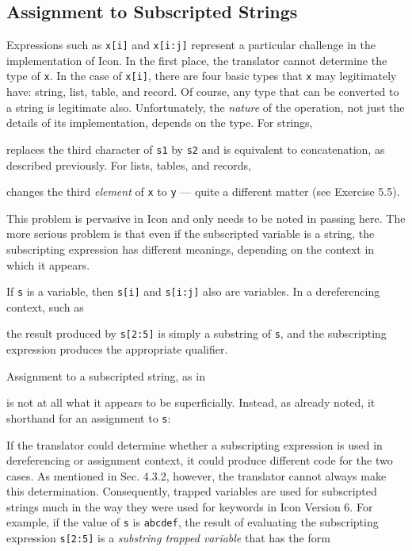 \subsection{Assignment to Subscripted Strings}

Expressions such as \texttt{x[i]} and \texttt{x[i:j]} represent a
particular challenge in the implementation of Icon. In the first
place, the translator cannot determine the type of \texttt{x}. In the case of
\texttt{x[i]}, there are four basic types that \texttt{x} may
legitimately have: string, list, table, and record. Of course, any
type that can be converted to a string is legitimate
also. Unfortunately, the \textit{nature }of the operation, not just
the details of its implementation, depends on the type. For strings,


\noindent replaces the third character of \texttt{s1} by \texttt{s2}
and is equivalent to concatenation, as described previously.  For
lists, tables, and records,


\noindent changes the third \textit{element }of \texttt{x} to
\texttt{y} --- quite a different matter (see Exercise 5.5).

This problem is pervasive in Icon and only needs to be noted in
passing here. The more serious problem is that even if the subscripted
variable is a string, the subscripting expression has different
meanings, depending on the context in which it appears.

If \texttt{s} is a variable, then \texttt{s[i]} and \texttt{s[i:j]}
also are variables. In a dereferencing context, such as


\noindent the result produced by \texttt{s[2:5]} is simply a substring
of \texttt{s}, and the subscripting expression produces the
appropriate qualifier.

Assignment to a subscripted string, as in


\noindent is not at all what it appears to be superficially. Instead,
as already noted, it shorthand for an assignment to \texttt{s}:


If the translator could determine whether a subscripting expression is
used in dereferencing or assignment context, it could produce
different code for the two cases. As mentioned in Sec. 4.3.2, however,
the translator cannot always make this determination. Consequently,
trapped variables are used for subscripted strings much in the way they
were used for keywords in Icon Version 6. For example, if the value of \texttt{s} is
\texttt{{\textquotedbl}abcdef{\textquotedbl}}, the result of
evaluating the subscripting expression \texttt{s[2:5]} is a
\textit{substring trapped variable} that has the form

